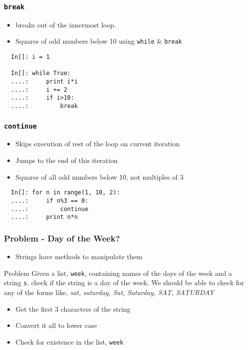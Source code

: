 \begin{frame}[fragile]
  \frametitle{\texttt{break}}
  \begin{itemize}
  \item breaks out of the innermost loop.
  \item Squares of odd numbers below 10 using \texttt{while} \&
    \texttt{break}
  \end{itemize}
  \begin{lstlisting}
  In[]: i = 1

  In[]: while True:
  ....:     print i*i
  ....:     i += 2
  ....:     if i>10:
  ....:         break
  \end{lstlisting}
\end{frame}

\begin{frame}[fragile]
  \frametitle{\texttt{continue}}
  \begin{itemize}
  \item Skips execution of rest of the loop on current iteration
  \item Jumps to the end of this iteration
  \item Squares of all odd numbers below 10, not multiples of 3
  \end{itemize}
  \begin{lstlisting}
  In[]: for n in range(1, 10, 2):
  ....:     if n%3 == 0:
  ....:         continue      
  ....:     print n*n
  \end{lstlisting}
\end{frame}

\begin{frame}[fragile]
  \frametitle{Problem - Day of the Week?}
  \begin{itemize}
  \item Strings have methods to manipulate them
  \end{itemize}
  \begin{block}{Problem}
    Given a list, \texttt{week}, containing names of the days of the
    week and a string \texttt{s}, check if the string is a day of the
    week. We should be able to check for any of the forms like,
    \emph{sat, saturday, Sat, Saturday, SAT, SATURDAY}
  \end{block}
  \begin{itemize}
  \item Get the first 3 characters of the string
  \item Convert it all to lower case
  \item Check for existence in the list, \texttt{week}
  \end{itemize}
\end{frame}


